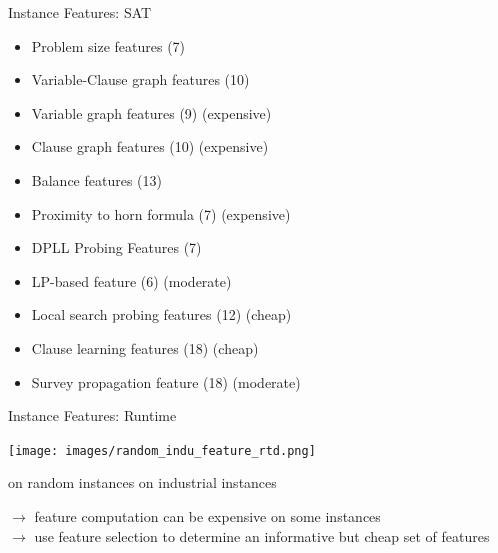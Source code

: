 \begin{frame}[c]{Instance Features: SAT}

\begin{itemize}
  \item Problem size features (7)
  \item Variable-Clause graph features (10)
  \item Variable graph features (9) (expensive)
  \item Clause graph features (10) (expensive)
  \item Balance features (13)
  \item Proximity to horn formula (7) (expensive)
  \item DPLL Probing Features (7)
  \item LP-based feature (6) (moderate)
  \item Local search probing features (12) (cheap)
  \item Clause learning features (18) (cheap)
  \item Survey propagation feature (18) (moderate)
\end{itemize}


\end{frame}
\begin{frame}[c]{Instance Features: Runtime~}

\centering
\texttt{[image: images/random\_indu\_feature\_rtd.png]}

on random instances \hspace{2.2cm}  on industrial instances\

\bigskip
\pause

\flushleft
$\to$ feature computation can be expensive on some instances\\
$\to$ use feature selection to determine an informative but cheap set of features

\end{frame}

